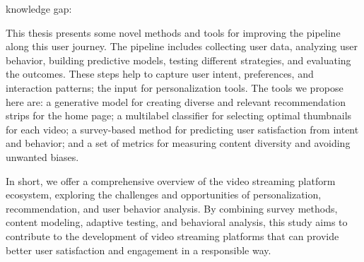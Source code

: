 knowledge gap: 

This thesis presents some novel methods and tools for improving the pipeline along this user journey. The pipeline includes collecting user data, analyzing user behavior, building predictive models, testing different strategies, and evaluating the outcomes. These steps help to capture user intent, preferences, and interaction patterns; the input for personalization tools. The tools we propose here are: a generative model for creating diverse and relevant recommendation strips for the home page; a multilabel classifier for selecting optimal thumbnails for each video; a survey-based method for predicting user satisfaction from intent and behavior; and a set of metrics for measuring content diversity and avoiding unwanted biases.

In short, we offer a comprehensive overview of the video streaming platform ecosystem, exploring the challenges and opportunities of personalization, recommendation, and user behavior analysis. By combining survey methods, content modeling, adaptive testing, and behavioral analysis, this study aims to contribute to the development of video streaming platforms that can provide better user satisfaction and engagement in a responsible way.









